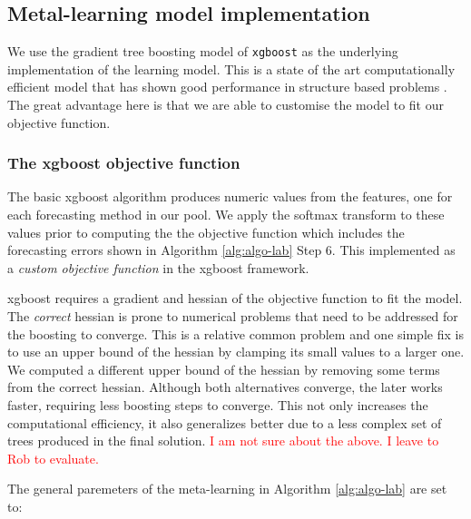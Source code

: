 \documentclass[11pt,a4paper,]{article}
\theoremstyle{definition}
\theoremstyle{definition}
\theoremstyle{definition}
\theoremstyle{remark}
\begin{document}
\subsection{Metal-learning model
implementation}\label{metal-learning-model-implementation}

We use the gradient tree boosting model of \texttt{xgboost} as the
underlying implementation of the learning model. This is a state of the
art computationally efficient model that has shown good performance in
structure based problems \autocite{chen2016xgboost}. The great advantage
here is that we are able to customise the model to fit our objective
function.

\subsubsection{The xgboost objective
function}\label{the-xgboost-objective-function}

The basic xgboost algorithm produces numeric values from the features,
one for each forecasting method in our pool. We apply the softmax
transform to these values prior to computing the the objective function
which includes the forecasting errors shown in Algorithm
\ref{alg:algo-lab} Step 6. This implemented as a \emph{custom objective
function} in the xgboost framework.

xgboost requires a gradient and hessian of the objective function to fit
the model. The \emph{correct} hessian is prone to numerical problems
that need to be addressed for the boosting to converge. This is a
relative common problem and one simple fix is to use an upper bound of
the hessian by clamping its small values to a larger one. We computed a
different upper bound of the hessian by removing some terms from the
correct hessian. Although both alternatives converge, the later works
faster, requiring less boosting steps to converge. This not only
increases the computational efficiency, it also generalizes better due
to a less complex set of trees produced in the final solution.
\textcolor{red}{I am not sure about the above. I leave to Rob to evaluate.}

The general paremeters of the meta-learning in Algorithm
\ref{alg:algo-lab} are set to:
\end{document}
